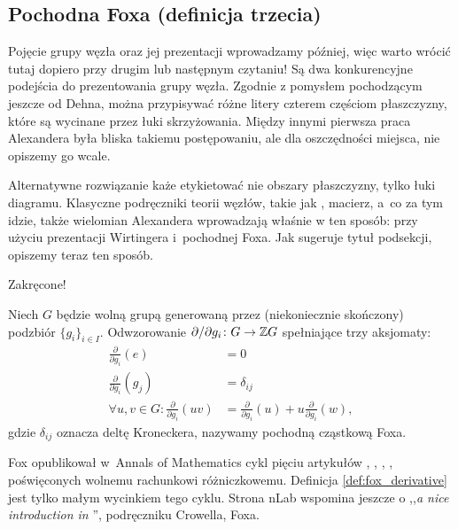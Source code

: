 
\subsection{Pochodna Foxa (definicja trzecia)}
%
Pojęcie grupy węzła oraz jej prezentacji wprowadzamy później, więc warto wrócić tutaj dopiero przy drugim lub następnym czytaniu!
Są dwa konkurencyjne podejścia do prezentowania grupy węzła.
Zgodnie z pomysłem pochodzącym jeszcze od Dehna, można przypisywać różne litery czterem częściom płaszczyzny, które są wycinane przez łuki skrzyżowania.
%
Między innymi pierwsza praca Alexandera była bliska takiemu postępowaniu, ale dla oszczędności miejsca, nie opiszemy go wcale.
%

Alternatywne rozwiązanie każe etykietować nie obszary płaszczyzny, tylko łuki diagramu.
Klasyczne podręczniki teorii węzłów, takie jak \cite{crowell63}, macierz, a~co za tym idzie, także wielomian Alexandera wprowadzają właśnie w ten sposób: przy użyciu prezentacji Wirtingera i~pochodnej Foxa.
Jak sugeruje tytuł podsekcji, opiszemy teraz ten sposób.

Zakręcone!

\begin{definition}
\label{def:fox_derivative}%
    Niech $G$ będzie wolną grupą generowaną przez (niekoniecznie skończony) podzbiór $\{g_i\}_{i \in I}$.
    Odwzorowanie $\partial/\partial g_i \colon G \to \mathbb Z G$ spełniające trzy aksjomaty:
    \begin{align}
        \frac{\partial}{\partial g_i} (e) & = 0 \\
        \frac{\partial}{\partial g_i} (g_j) & = \delta_{ij} \\
        \forall u, v \in G : \frac{\partial}{\partial g_i} (uv) & = \frac{\partial}{\partial g_i}(u) + u \frac{\partial}{\partial g_i} (w),
    \end{align}
    gdzie $\delta_{ij}$ oznacza deltę Kroneckera, nazywamy pochodną cząstkową Foxa.
\end{definition}

Fox opublikował w~Annals of Mathematics cykl pięciu artykułów \cite{fox53}, \cite{fox54}, \cite{fox56}, \cite{fox58}, \cite{fox60} poświęconych wolnemu rachunkowi różniczkowemu.
%
Definicja \ref{def:fox_derivative} jest tylko małym wycinkiem tego cyklu.
Strona nLab wspomina jeszcze o ,,\emph{a nice introduction in} \cite{crowell63}'', podręczniku Crowella, Foxa.

